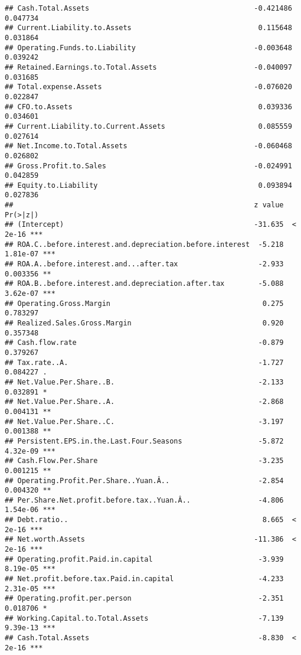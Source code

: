 \documentclass[
]{article}
\begin{document}
\begin{verbatim}
## Cash.Total.Assets                                       -0.421486   0.047734
## Current.Liability.to.Assets                              0.115648   0.031864
## Operating.Funds.to.Liability                            -0.003648   0.039242
## Retained.Earnings.to.Total.Assets                       -0.040097   0.031685
## Total.expense.Assets                                    -0.076020   0.022847
## CFO.to.Assets                                            0.039336   0.034601
## Current.Liability.to.Current.Assets                      0.085559   0.027614
## Net.Income.to.Total.Assets                              -0.060468   0.026802
## Gross.Profit.to.Sales                                   -0.024991   0.042859
## Equity.to.Liability                                      0.093894   0.027836
##                                                         z value Pr(>|z|)    
## (Intercept)                                             -31.635  < 2e-16 ***
## ROA.C..before.interest.and.depreciation.before.interest  -5.218 1.81e-07 ***
## ROA.A..before.interest.and...after.tax                   -2.933 0.003356 ** 
## ROA.B..before.interest.and.depreciation.after.tax        -5.088 3.62e-07 ***
## Operating.Gross.Margin                                    0.275 0.783297    
## Realized.Sales.Gross.Margin                               0.920 0.357348    
## Cash.flow.rate                                           -0.879 0.379267    
## Tax.rate..A.                                             -1.727 0.084227 .  
## Net.Value.Per.Share..B.                                  -2.133 0.032891 *  
## Net.Value.Per.Share..A.                                  -2.868 0.004131 ** 
## Net.Value.Per.Share..C.                                  -3.197 0.001388 ** 
## Persistent.EPS.in.the.Last.Four.Seasons                  -5.872 4.32e-09 ***
## Cash.Flow.Per.Share                                      -3.235 0.001215 ** 
## Operating.Profit.Per.Share..Yuan.Â..                     -2.854 0.004320 ** 
## Per.Share.Net.profit.before.tax..Yuan.Â..                -4.806 1.54e-06 ***
## Debt.ratio..                                              8.665  < 2e-16 ***
## Net.worth.Assets                                        -11.386  < 2e-16 ***
## Operating.profit.Paid.in.capital                         -3.939 8.19e-05 ***
## Net.profit.before.tax.Paid.in.capital                    -4.233 2.31e-05 ***
## Operating.profit.per.person                              -2.351 0.018706 *  
## Working.Capital.to.Total.Assets                          -7.139 9.39e-13 ***
## Cash.Total.Assets                                        -8.830  < 2e-16 ***

\end{verbatim}
\end{document}
